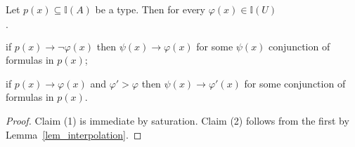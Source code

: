 \documentclass[11pt,oneside]{amsart}
\newcommand{\mylabel}[1]{{#1}\hfill}
\renewenvironment{itemize}
  {\begin{list}{$\cdot$}{%
  \setlength{\parskip}{0mm}
  \setlength{\topsep}{.2\baselineskip}
  \setlength{\rightmargin}{0mm}
  \setlength{\listparindent}{0mm}
  \setlength{\itemindent}{0mm}
  \setlength{\labelwidth}{3ex}
  \setlength{\itemsep}{.2\baselineskip}
  \setlength{\parsep}{.2\baselineskip}
  \setlength{\partopsep}{0mm}
  \setlength{\labelsep}{1ex}
  \setlength{\leftmargin}{\labelwidth+\labelsep}
  \let\makelabel\mylabel}}{%
\end{list}}
\begin{document}
\begin{fact}\label{fact_compactness_imp}
  Let $p(x)\subseteq\mathds{I}(A)$ be a type.
  Then for every  $\varphi(x)\in\mathds{I}(U)$
  \begin{itemize}
    \item[1.] if $p(x)\rightarrow\neg\varphi(x)$ then $\psi(x)\rightarrow\varphi(x)$ for some $\psi(x)$ conjunction of formulas in $p(x)$;
    \item[2.] if $p(x)\rightarrow\varphi(x)$ and $\varphi'>\varphi$ then $\psi(x)\rightarrow\varphi'(x)$ for some conjunction of formulas in $p(x)$.
  \end{itemize} 
\end{fact}

\begin{proof}
  Claim (1) is immediate by saturation.
  Claim (2) follows from the first by Lemma~\ref{lem_interpolation}.
\end{proof}



  











\end{document}
